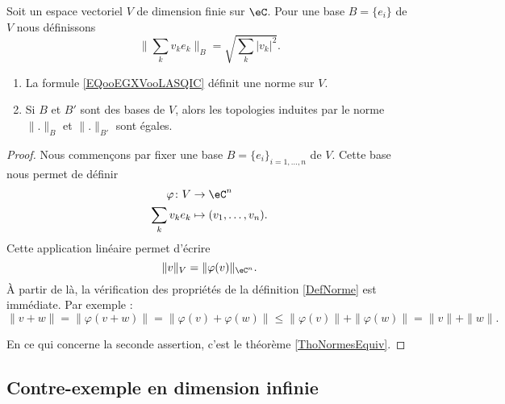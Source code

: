 \begin{proposition} \label{PROPooNTCFooEcwZwt}
	Soit un espace vectoriel \( V\) de dimension finie sur \( \eC\). Pour une base \( B= \{ e_i \}\) de \( V\) nous définissons
	\begin{equation}        \label{EQooEGXVooLASQIC}
		\| \sum_kv_ke_k \|_B= \sqrt{ \sum_k| v_k |^2 }.
	\end{equation}
	\begin{enumerate}
		\item
		      La formule \eqref{EQooEGXVooLASQIC} définit une norme sur \( V\).
		\item
		      Si \( B\) et \( B'\) sont des bases de \( V\), alors les topologies induites par le norme \( \| . \|_B\) et \( \| . \|_{B'}\) sont égales.
	\end{enumerate}
\end{proposition}

\begin{proof}
	Nous commençons par fixer une base \( B=\{ e_i \}_{i=1,\ldots, n}\) de \( V\). Cette base nous permet de définir
	\begin{equation}
		\begin{aligned}
			\varphi\colon V & \to \eC^n                  \\
			\sum_kv_ke_k    & \mapsto (v_1,\ldots, v_n).
		\end{aligned}
	\end{equation}
	Cette application linéaire permet d'écrire
	\begin{equation}
		\| v \|_V=\| \varphi(v) \|_{\eC^n}.
	\end{equation}
	À partir de là, la vérification des propriétés de la définition \ref{DefNorme} est immédiate. Par exemple :
	\begin{equation}
		\| v+w \|=\| \varphi(v+w) \|=\| \varphi(v)+\varphi(w) \|\leq \| \varphi(v) \|+\| \varphi(w) \|=\| v \|+\| w \|.
	\end{equation}

	En ce qui concerne la seconde assertion, c'est le théorème \ref{ThoNormesEquiv}.
\end{proof}

\subsection{Contre-exemple en dimension infinie}
\label{SubSecPOlynomesCE}

